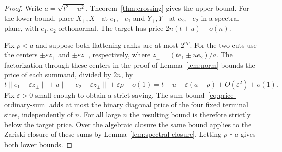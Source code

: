 \begin{proof}
Write $a=\sqrt{t^2+u^2}$. Theorem~\ref{thm:crossing} gives the upper
bound. For the lower bound, place $X_+,X_-$ at $e_1,-e_1$ and
$Y_+,Y_-$ at $e_2,-e_2$ in a spectral plane, with $e_1,e_2$
orthonormal. The target has price $2n(t+u)+o(n)$.

Fix $\rho<a$ and suppose both flattening ranks are at most $2^{n\rho}$.
For the two cuts use the centers $\pm\varepsilon z_+$ and
$\pm\varepsilon z_-$, respectively, where
$z_\pm=(t e_1\pm u e_2)/a$. The factorization through these centers
in the proof of Lemma~\ref{lem:norm} bounds the price of each summand, divided
by $2n$, by
\[
 t\|e_1-\varepsilon z_\pm\|
   +u\|\pm e_2-\varepsilon z_\pm\|+\varepsilon\rho+o(1)
 = t+u-\varepsilon(a-\rho)+O(\varepsilon^2)+o(1).
\]
Fix $\varepsilon>0$ small enough to obtain a strict saving. The sum
bound~\eqref{eq:price-ordinary-sum} adds at most the binary diagonal
price of the four fixed terminal sites, independently of $n$. For all
large $n$ the resulting bound is therefore strictly below the target
price. Over the algebraic closure the same bound applies to the
Zariski closure of these sums by Lemma~\ref{lem:spectral-closure}.
Letting $\rho\uparrow a$ gives both lower bounds.
\end{proof}
